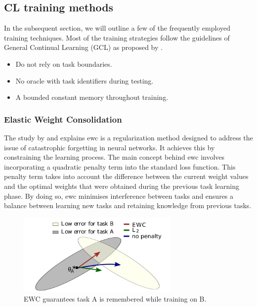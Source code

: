 \subsection{CL training methods}
In the subsequent section, we will outline a few of the frequently employed training techniques. Most of the training strategies follow the guidelines of General Continual Learning (GCL) as proposed by \citep{farquhar2018towards}. 
\begin{itemize}
    \item Do not rely on task boundaries.
    \item No oracle with task identifiers during testing.
    \item A bounded constant memory throughout training.
\end{itemize}

\subsubsection{Elastic Weight Consolidation}
\label{sec:ewc}
The study by \citep{kirkpatrick2017overcoming} and \citep{de2021continual} explains \acrshort{ewc} is a regularization method designed to address the issue of catastrophic forgetting in neural networks. It achieves this by constraining the learning process. The main concept behind \acrshort{ewc} involves incorporating a quadratic penalty term into the standard loss function. This penalty term takes into account the difference between the current weight values and the optimal weights that were obtained during the previous task learning phase. By doing so, \acrshort{ewc} minimises interference between tasks and ensures a balance between learning new tasks and retaining knowledge from previous tasks.
\begin{figure}[h]
\centering
    \includegraphics[width=0.7\textwidth]{Images//ewc.png}
    \caption{EWC guarantees task A is remembered while training on B. \citep{kirkpatrick2017overcoming}}
    \label{fig:ewc}
\end{figure}
